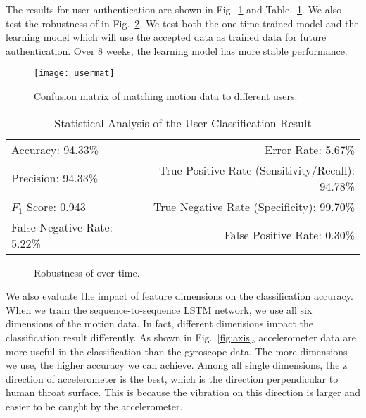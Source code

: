 The results for user authentication are shown in Fig.~\ref{fig:usermat} and Table.~\ref{tab:userTable}. We also test the robustness of {\shortname} in Fig.~\ref{fig:time}. We test both the one-time trained model and the learning model which will use the accepted data as trained data for future authentication. Over 8 weeks, the learning model has more stable performance.
\begin{figure}[h]
	\centering
	\texttt{[image: usermat]}
	\caption{Confusion matrix of matching motion data to different users.}
	\label{fig:usermat}
\end{figure}
\begin{table}[t]
	\caption{Statistical Analysis of the User Classification Result}
	\label{tab:userTable}
	\centering
	\begin{tabular}{lr}
		\toprule
		Accuracy: 94.33\% & \hspace{-.55in} Error Rate: 5.67\% \\
		Precision: 94.33\% & \hspace{-.55in} True Positive Rate (Sensitivity/Recall): 94.78\% \\
		$F_1$ Score: 0.943 & \hspace{-.55in} True Negative Rate (Specificity): 99.70\% \\
		False Negative Rate: 5.22\%  & \hspace{-.55in} False Positive Rate: 0.30\% \\
		\bottomrule
	\end{tabular}
\end{table}
\begin{figure}[h]
	\centering
	\caption{Robustness of {\shortname} over time.}
	\label{fig:time}
\end{figure}



We also evaluate the impact of feature dimensions on the classification accuracy. When we train the sequence-to-sequence LSTM network, we use all six dimensions of the motion data. In fact, different dimensions impact the classification result differently. As shown in Fig.~\ref{fig:axis}, accelerometer data are more useful in the classification than the gyroscope data. The more dimensions we use, the higher accuracy we can achieve. Among all single dimensions, the z direction of accelerometer is the best, which is the direction perpendicular to human throat surface. This is because the vibration on this direction is larger and easier to be caught by the accelerometer.

